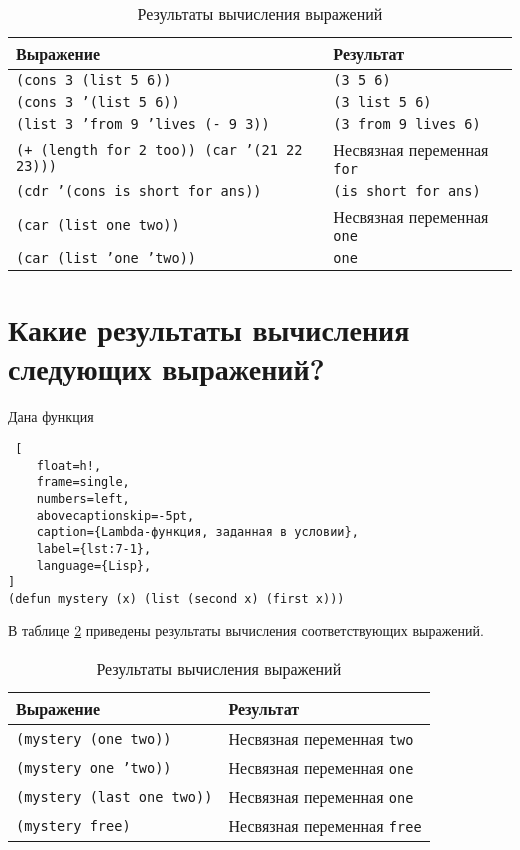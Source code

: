 \begin{table}[!ht]
    \small
	\begin{center}
		\caption{Результаты вычисления выражений}
		\label{tbl:6-1}
		\begin{tabular}{|l|l|}
			\hline
			\bfseries Выражение & \bfseries Результат \\\hline
            \texttt{(cons 3 (list 5 6))} & \texttt{(3 5 6)} \\\hline
            \texttt{(cons 3 '(list 5 6))} & \texttt{(3 list 5 6)} \\\hline
            \texttt{(list 3 'from 9 'lives (- 9 3))} & \texttt{(3 from 9 lives 6)} \\\hline
            \texttt{(+ (length for 2 too)) (car '(21 22 23)))} & Несвязная переменная \texttt{for} \\\hline
            \texttt{(cdr '(cons is short for ans))} & \texttt{(is short for ans)} \\\hline
            \texttt{(car (list one two))} & Несвязная переменная \texttt{one} \\\hline
            \texttt{(car (list 'one 'two))} & \texttt{one} \\\hline
		\end{tabular}
	\end{center}
\end{table}

\section{Какие результаты вычисления следующих выражений?}

Дана функция

\begin{lstlisting} [
	float=h!,
	frame=single,
	numbers=left,
	abovecaptionskip=-5pt,
	caption={Lambda-функция, заданная в условии},
	label={lst:7-1},
	language={Lisp},
]
(defun mystery (x) (list (second x) (first x)))
\end{lstlisting}

В таблице \ref{tbl:7-1} приведены результаты вычисления соответствующих выражений.

\begin{table}[!ht]
    \small
	\begin{center}
		\caption{Результаты вычисления выражений}
		\label{tbl:7-1}
		\begin{tabular}{|l|l|}
			\hline
			\bfseries Выражение & \bfseries Результат \\\hline
            \texttt{(mystery (one two))} & Несвязная переменная \texttt{two} \\\hline
            \texttt{(mystery one 'two))} & Несвязная переменная \texttt{one} \\\hline
            \texttt{(mystery (last one two))} & Несвязная переменная \texttt{one} \\\hline
            \texttt{(mystery free)} & Несвязная переменная \texttt{free} \\\hline
		\end{tabular}
	\end{center}
\end{table}

